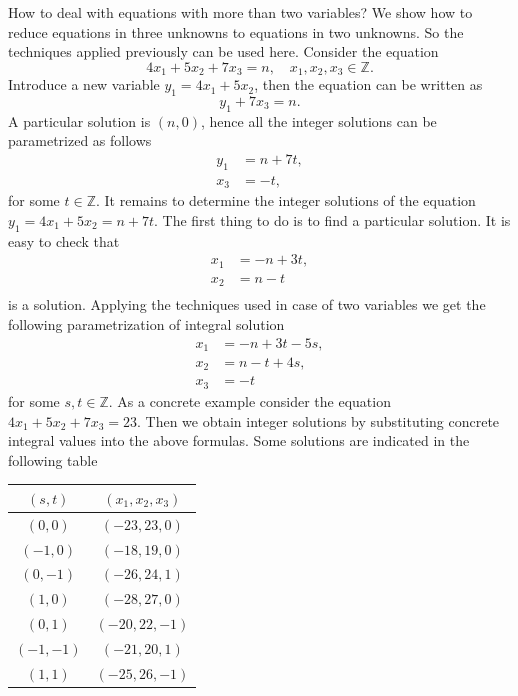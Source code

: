 How to deal with equations with more than two variables? We show how to reduce equations in three unknowns to
equations in two unknowns. So the techniques applied previously can be used here. Consider the equation
$$
4x_1+5x_2+7x_3=n,\quad x_1,x_2,x_3\in\mathbb{Z}.
$$
Introduce a new variable $y_1=4x_1+5x_2$, then the equation can be written as
$$
y_1+7x_3=n.
$$
A particular solution is $(n,0)$, hence all the integer solutions can be parametrized as follows
\begin{align*}
y_1&=n+7t,\\
x_3&=-t,
\end{align*}
for some $t\in\mathbb{Z}$. It remains to determine the integer solutions of the equation $y_1=4x_1+5x_2=n+7t$.
The first thing to do is to find a particular solution. It is easy to check that
\begin{align*}
x_1&=-n+3t,\\
x_2&=n-t\\
\end{align*}
is a solution. Applying the techniques used in case of two variables we get the following parametrization of
integral solution
\begin{align*}
x_1&=-n+3t-5s,\\
x_2&=n-t+4s,\\
x_3&=-t
\end{align*}
for some $s,t\in\mathbb{Z}$. As a concrete example consider the equation $4x_1+5x_2+7x_3=23$. Then we obtain
integer solutions by substituting concrete integral values into the above formulas. Some solutions are indicated
in the following table
\begin{center}
\begin{tabular}{|c|c|}
\hline
$(s,t)$ & $(x_1,x_2,x_3)$\\
\hline
$(0,0)$ & $(-23, 23, 0)$\\
\hline
$(-1,0)$ & $(-18, 19, 0)$\\
\hline
$(0,-1)$ & $(-26, 24, 1)$\\
\hline
$(1,0)$ & $(-28, 27, 0)$\\
\hline
$(0,1)$ & $(-20, 22, -1)$\\
\hline
$(-1,-1)$ & $(-21, 20, 1)$\\
\hline
$(1,1)$ & $(-25, 26, -1)$\\
\hline
\end{tabular}
\end{center}

